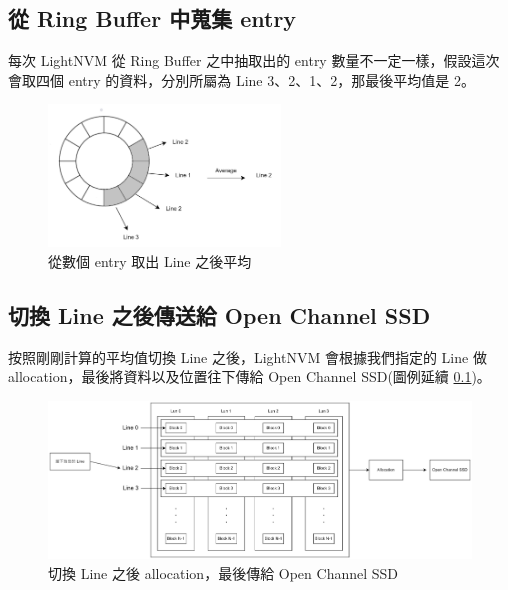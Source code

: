 \subsection{從 Ring Buffer 中蒐集 entry}\label{s3.3.1}
\indent
每次 LightNVM 從 Ring Buffer 之中抽取出的 entry 數量不一定一樣，假設這次會取四個 entry 的資料，分別所屬為 Line 3、2、1、2，那最後平均值是 2。

\begin{figure}[H]
    \centering
    \includegraphics[width=0.55\textwidth]{picture/ch3/get_entry_from_ring_buffer.png}
    \caption{從數個 entry 取出 Line 之後平均}
    \label{f3.6}
\end{figure}

\subsection{切換 Line 之後傳送給 Open Channel SSD}\label{s3.3.2}
\indent
按照剛剛計算的平均值切換 Line 之後，LightNVM 會根據我們指定的 Line 做 allocation，最後將資料以及位置往下傳給 Open Channel SSD(圖例延續 \ref{s3.3.1})。
\begin{figure}[H]
    \centering
    \includegraphics[width=1\textwidth]{picture/ch3/switch_line_to_opssd.png}
    \caption{切換 Line 之後 allocation，最後傳給 Open Channel SSD}
    \label{f3.7}
\end{figure}

